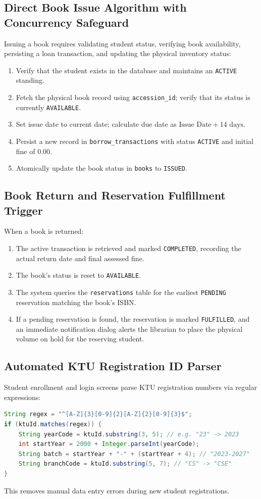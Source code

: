 \subsection{Direct Book Issue Algorithm with Concurrency Safeguard}
Issuing a book requires validating student status, verifying book availability, persisting a loan transaction, and updating the physical inventory status:
\begin{enumerate}
    \item Verify that the student exists in the database and maintains an \texttt{ACTIVE} standing.
    \item Fetch the physical book record using \texttt{accession\_id}; verify that its status is currently \texttt{AVAILABLE}.
    \item Set issue date to current date; calculate due date as $\text{Issue Date} + 14 \text{ days}$.
    \item Persist a new record in \texttt{borrow\_transactions} with status \texttt{ACTIVE} and initial fine of $0.00$.
    \item Atomically update the book status in \texttt{books} to \texttt{ISSUED}.
\end{enumerate}

\subsection{Book Return and Reservation Fulfillment Trigger}
When a book is returned:
\begin{enumerate}
    \item The active transaction is retrieved and marked \texttt{COMPLETED}, recording the actual return date and final assessed fine.
    \item The book's status is reset to \texttt{AVAILABLE}.
    \item The system queries the \texttt{reservations} table for the earliest \texttt{PENDING} reservation matching the book's ISBN.
    \item If a pending reservation is found, the reservation is marked \texttt{FULFILLED}, and an immediate notification dialog alerts the librarian to place the physical volume on hold for the reserving student.
\end{enumerate}

\subsection{Automated KTU Registration ID Parser}
Student enrollment and login screens parse KTU registration numbers via regular expressions:
\begin{lstlisting}[language=Java, caption={KTU ID Validation and Batch Derivation}]
String regex = "^[A-Z]{3}[0-9]{2}[A-Z]{2}[0-9]{3}$";
if (ktuId.matches(regex)) {
    String yearCode = ktuId.substring(3, 5); // e.g. "23" -> 2023
    int startYear = 2000 + Integer.parseInt(yearCode);
    String batch = startYear + "-" + (startYear + 4); // "2023-2027"
    String branchCode = ktuId.substring(5, 7); // "CS" -> "CSE"
}
\end{lstlisting}
This removes manual data entry errors during new student registrations.
